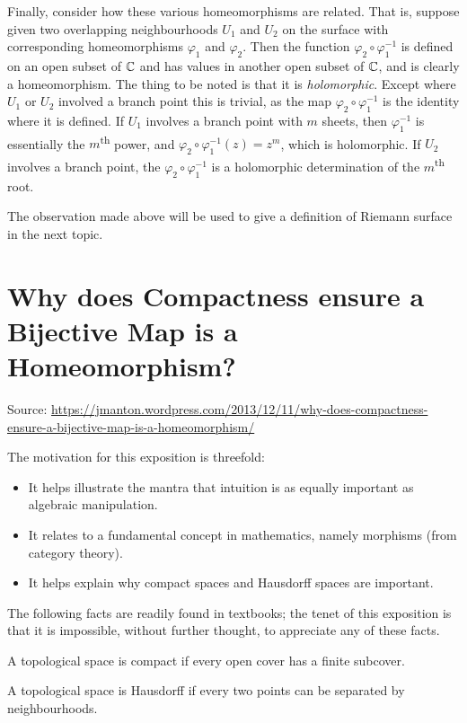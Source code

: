 \documentclass[a4paper,11pt]{article}
\newcounter{topic}
\begin{document}
Finally, consider how these various homeomorphisms are related.  That
is, suppose given two overlapping neighbourhoods $U_1$ and $U_2$ on
the surface with corresponding homeomorphisms $\varphi_1$ and
$\varphi_2$.  Then the function $\varphi_2 \circ \varphi_1^{-1}$ is
defined on an open subset of ${\mathbb C}$ and has values in another open
subset of ${\mathbb C}$, and is clearly a homeomorphism.  The thing to be
noted is that it is \emph{holomorphic}.  Except where $U_1$ or $U_2$
involved a branch point this is trivial, as the map $\varphi_2 \circ
\varphi_1^{-1}$ is the identity where it is defined.  If $U_1$
involves a branch point with $m$ sheets, then $\varphi_1^{-1}$ is
essentially the $m$\textsuperscript{th} power, and $\varphi_2 \circ
\varphi_1^{-1}(z) = z^m$, which is holomorphic.  If $U_2$ involves a
branch point, the $\varphi_2 \circ \varphi_1^{-1}$ is a holomorphic
determination of the $m$\textsuperscript{th} root.

The observation made above will be used to give a definition of
Riemann surface in the next topic.

\newpage
\section{Why does Compactness ensure a Bijective Map is a Homeomorphism?}

Source: \url{https://jmanton.wordpress.com/2013/12/11/why-does-compactness-ensure-a-bijective-map-is-a-homeomorphism/}

The motivation for this exposition is threefold:
\begin{itemize}
\item It helps illustrate the mantra that intuition is as equally
  important as algebraic manipulation.
\item It relates to a fundamental concept in mathematics, namely
  morphisms (from category theory).
\item It helps explain why compact spaces and Hausdorff spaces are
  important.
\end{itemize}

The following facts are readily found in textbooks; the tenet of this
exposition is that it is impossible, without further thought, to
appreciate any of these facts.

A topological space is compact if every open cover has a finite
subcover.

A topological space is Hausdorff if every two points can be separated
by neighbourhoods.
\end{document}
